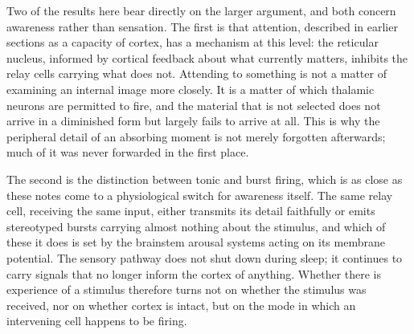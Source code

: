 \documentclass[11pt]{article}
\begin{document}
Two of the results here bear directly on the larger argument, and both concern awareness rather than sensation. The first is that attention, described in earlier sections as a capacity of cortex, has a mechanism at this level: the reticular nucleus, informed by cortical feedback about what currently matters, inhibits the relay cells carrying what does not. Attending to something is not a matter of examining an internal image more closely. It is a matter of which thalamic neurons are permitted to fire, and the material that is not selected does not arrive in a diminished form but largely fails to arrive at all. This is why the peripheral detail of an absorbing moment is not merely forgotten afterwards; much of it was never forwarded in the first place.

The second is the distinction between tonic and burst firing, which is as close as these notes come to a physiological switch for awareness itself. The same relay cell, receiving the same input, either transmits its detail faithfully or emits stereotyped bursts carrying almost nothing about the stimulus, and which of these it does is set by the brainstem arousal systems acting on its membrane potential. The sensory pathway does not shut down during sleep; it continues to carry signals that no longer inform the cortex of anything. Whether there is experience of a stimulus therefore turns not on whether the stimulus was received, nor on whether cortex is intact, but on the mode in which an intervening cell happens to be firing.
\end{document}

